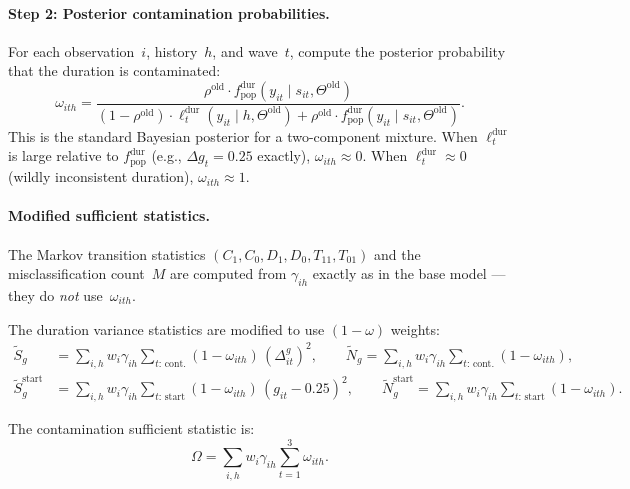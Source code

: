 \documentclass[12pt]{article}
\begin{document}
\paragraph{Step 2: Posterior contamination probabilities.}
For each observation~\(i\), history~\(h\), and wave~\(t\), compute the posterior probability that the duration is contaminated:
\begin{equation}
\omega_{ith} = \frac{\rho^{\mathrm{old}} \cdot f^{\mathrm{dur}}_{\mathrm{pop}}(y_{it} \mid s_{it}, \Theta^{\mathrm{old}})}{(1 - \rho^{\mathrm{old}}) \cdot \ell^{\mathrm{dur}}_t(y_{it} \mid h, \Theta^{\mathrm{old}}) + \rho^{\mathrm{old}} \cdot f^{\mathrm{dur}}_{\mathrm{pop}}(y_{it} \mid s_{it}, \Theta^{\mathrm{old}})}.
\label{eq:omega}
\end{equation}
This is the standard Bayesian posterior for a two-component mixture. When \(\ell^{\mathrm{dur}}_t\) is large relative to \(f^{\mathrm{dur}}_{\mathrm{pop}}\) (e.g., \(\Delta g_t = 0.25\) exactly), \(\omega_{ith} \approx 0\). When \(\ell^{\mathrm{dur}}_t \approx 0\) (wildly inconsistent duration), \(\omega_{ith} \approx 1\).

\paragraph{Modified sufficient statistics.}
The Markov transition statistics \((C_1, C_0, D_1, D_0, T_{11}, T_{01})\) and the misclassification count~\(M\) are computed from \(\gamma_{ih}\) exactly as in the base model --- they do \emph{not} use~\(\omega_{ith}\).

The duration variance statistics are modified to use \((1 - \omega)\) weights:
\begin{align}
\tilde{S}_g &= \sum_{i,h} w_i \gamma_{ih} \sum_{t:\,\text{cont.}} (1 - \omega_{ith})\, (\Delta^g_{it})^2, \qquad
\tilde{N}_g = \sum_{i,h} w_i \gamma_{ih} \sum_{t:\,\text{cont.}} (1 - \omega_{ith}), \label{eq:suff_sg_rho} \\
\tilde{S}^{\mathrm{start}}_g &= \sum_{i,h} w_i \gamma_{ih} \sum_{t:\,\text{start}} (1 - \omega_{ith})\, (g_{it} - 0.25)^2, \qquad
\tilde{N}^{\mathrm{start}}_g = \sum_{i,h} w_i \gamma_{ih} \sum_{t:\,\text{start}} (1 - \omega_{ith}). \label{eq:suff_sg_start_rho}
\end{align}

The contamination sufficient statistic is:
\begin{equation}
\Omega = \sum_{i,h} w_i \gamma_{ih} \sum_{t=1}^3 \omega_{ith}.
\label{eq:suff_omega}
\end{equation}
\end{document}
